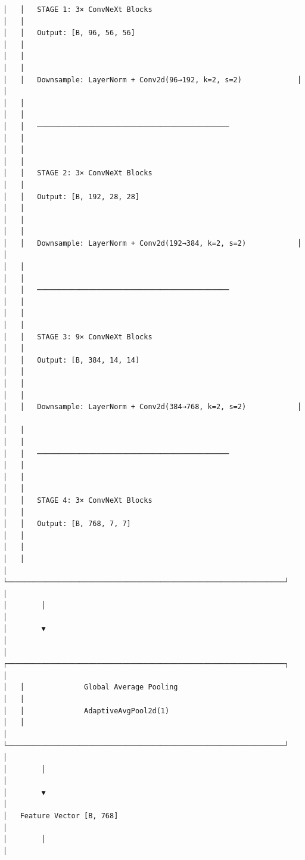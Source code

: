 \begin{verbatim}
│   │   STAGE 1: 3× ConvNeXt Blocks                                   │   │
│   │   Output: [B, 96, 56, 56]                                       │   │
│   │                                                                 │   │
│   │   Downsample: LayerNorm + Conv2d(96→192, k=2, s=2)             │   │
│   │                                                                 │   │
│   │   ─────────────────────────────────────────────                 │   │
│   │                                                                 │   │
│   │   STAGE 2: 3× ConvNeXt Blocks                                   │   │
│   │   Output: [B, 192, 28, 28]                                      │   │
│   │                                                                 │   │
│   │   Downsample: LayerNorm + Conv2d(192→384, k=2, s=2)            │   │
│   │                                                                 │   │
│   │   ─────────────────────────────────────────────                 │   │
│   │                                                                 │   │
│   │   STAGE 3: 9× ConvNeXt Blocks                                   │   │
│   │   Output: [B, 384, 14, 14]                                      │   │
│   │                                                                 │   │
│   │   Downsample: LayerNorm + Conv2d(384→768, k=2, s=2)            │   │
│   │                                                                 │   │
│   │   ─────────────────────────────────────────────                 │   │
│   │                                                                 │   │
│   │   STAGE 4: 3× ConvNeXt Blocks                                   │   │
│   │   Output: [B, 768, 7, 7]                                        │   │
│   │                                                                 │   │
│   └─────────────────────────────────────────────────────────────────┘   │
│        │                                                                │
│        ▼                                                                │
│   ┌─────────────────────────────────────────────────────────────────┐   │
│   │              Global Average Pooling                             │   │
│   │              AdaptiveAvgPool2d(1)                               │   │
│   └─────────────────────────────────────────────────────────────────┘   │
│        │                                                                │
│        ▼                                                                │
│   Feature Vector [B, 768]                                               │
│        │                                                                │

\end{verbatim}
